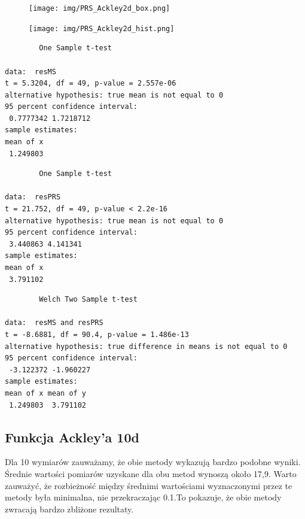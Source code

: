 \documentclass{article}
\begin{document}
\begin{figure}[H]
    \centering
    \texttt{[image: img/PRS\_Ackley2d\_box.png]}
    \label{fig:ackley}
\end{figure}

\begin{figure}[H]
    \centering
    \texttt{[image: img/PRS\_Ackley2d\_hist.png]}
    \label{fig:ackley}
\end{figure}



\newpage
\vspace{25pt}
\begin{verbatim}
        One Sample t-test

data:  resMS
t = 5.3204, df = 49, p-value = 2.557e-06
alternative hypothesis: true mean is not equal to 0
95 percent confidence interval:
 0.7777342 1.7218712
sample estimates:
mean of x
 1.249803
\end{verbatim}

\vspace{50pt}

\begin{verbatim}
        One Sample t-test

data:  resPRS
t = 21.752, df = 49, p-value < 2.2e-16
alternative hypothesis: true mean is not equal to 0
95 percent confidence interval:
 3.440863 4.141341
sample estimates:
mean of x
 3.791102
\end{verbatim}

\vspace{50pt}

\begin{verbatim}
        Welch Two Sample t-test

data:  resMS and resPRS
t = -8.6881, df = 90.4, p-value = 1.486e-13
alternative hypothesis: true difference in means is not equal to 0
95 percent confidence interval:
 -3.122372 -1.960227
sample estimates:
mean of x mean of y
 1.249803  3.791102
\end{verbatim}
\newpage

\subsection{Funkcja Ackley'a 10d}

\hspace{0.5cm} Dla 10 wymiarów zauważamy, że obie metody wykazują bardzo podobne wyniki. Średnie wartości pomiarów uzyskane dla obu metod wynoszą około 17,9. Warto zauważyć, że rozbieżność między średnimi wartościami wyznaczonymi przez te metody była minimalna, nie przekraczając 0.1.To pokazuje, że obie metody zwracają bardzo zbliżone rezultaty.  
\end{document}
